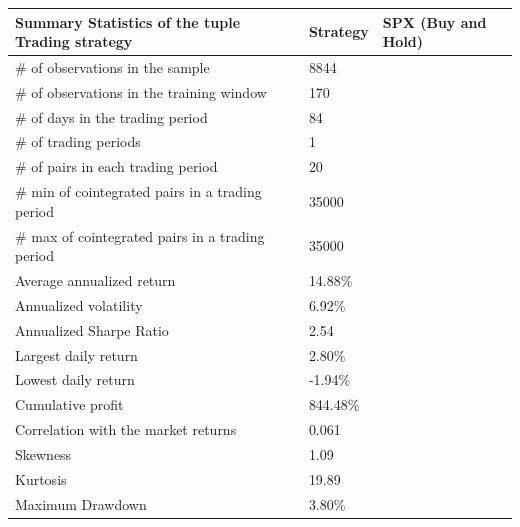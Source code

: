\documentclass[11pt,a4,twosided,singlespacing,titlepagenumber=on]{scrreprt}
\numberwithin{equation}{chapter} %
\theoremstyle{remark}
\begin{document}
\begin{table}[htb]
\centering
\begin{tabular}{lll}
\hline
Summary Statistics of the tuple Trading strategy				& Strategy & SPX (Buy and Hold)\\ \hline
\# of observations in the sample								& 8844  \\
\# of observations in the training window						& 170 \\
\# of days in the trading period								& 84 \\
\# of trading periods											& 1\\
\# of pairs in each trading period   							& 20\\
\# min of cointegrated pairs in a trading period 				& 35000\\
\# max of cointegrated pairs in a trading period 				& 35000\\
Average annualized return 										& 14.88\% \\
Annualized volatility 											& 6.92\% \\
Annualized Sharpe Ratio 										& 2.54  \\
Largest daily return 											& 2.80\% \\
Lowest daily return 											& -1.94\% \\
Cumulative profit 												& 844.48\%\\
Correlation with the market returns 							& 0.061\\
Skewness														& 1.09\\
Kurtosis 														& 19.89\\
Maximum Drawdown  												& 3.80\% \\
\hline
\end{tabular}
\end{table}
\end{document}
